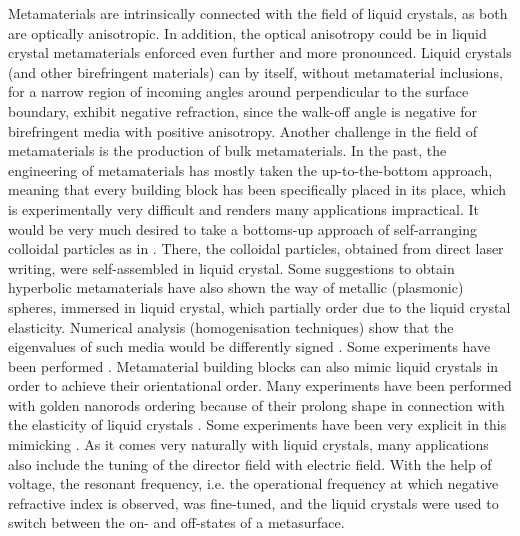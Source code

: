 \documentclass[a4paper,11pt]{article}
\begin{document}

Metamaterials are intrinsically connected with the field of liquid crystals, as both are optically anisotropic. 
In addition, the optical anisotropy could be in liquid crystal metamaterials enforced even further and more pronounced. 
Liquid crystals (and other birefringent materials) can by itself, without metamaterial inclusions, for a narrow region of incoming angles around perpendicular to the surface boundary, exhibit negative refraction, since the walk-off angle is negative for birefringent media with positive anisotropy. 
Another challenge in the field of metamaterials is the production of bulk metamaterials. 
In the past, the engineering of metamaterials has mostly taken the up-to-the-bottom approach, meaning that every building block has been specifically placed in its place, which is experimentally very difficult and renders many applications impractical. 
It would be very much desired to take a bottoms-up approach of self-arranging colloidal particles as in \cite{tartan}. 
There, the colloidal particles, obtained from direct laser writing, were self-assembled in liquid crystal. 
Some suggestions to obtain hyperbolic metamaterials have also shown the way of metallic (plasmonic) spheres, immersed in liquid crystal, which partially order due to the liquid crystal elasticity. 
Numerical analysis (homogenisation techniques) show that the eigenvalues of such media would be differently signed \cite{khoo}. 
Some experiments have been performed \cite{ponsinet-virginie?}. 
Metamaterial building blocks can also mimic liquid crystals in order to achieve their orientational order. 
Many experiments have been performed with golden nanorods ordering because of their prolong shape in connection with the elasticity of liquid crystals \cite{nanoparticles}. 
Some experiments have been very explicit in this mimicking \cite{shadrivov}. 
As it comes very naturally with liquid crystals, many applications also include the tuning of the director field with electric field. 
With the help of voltage, the resonant frequency, i.e. the operational frequency at which negative refractive index is observed, was fine-tuned, and the liquid crystals were used to switch between the on- and off-states of a metasurface. 

\end{document}

